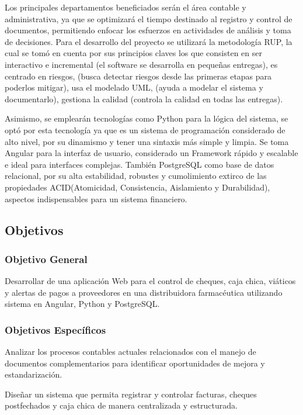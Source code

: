 Los principales departamentos beneficiados serán el área contable y administrativa, ya que se optimizará el tiempo destinado al registro y control de documentos, permitiendo enfocar los esfuerzos en actividades de análisis y toma de decisiones. Para el desarrollo del proyecto se utilizará la metodología RUP, la cual se tomó en cuenta por sus principios claves los que consisten en ser interactivo e incremental (el software se desarrolla en pequeñas entregas), es centrado en riesgos, (busca detectar riesgos desde las primeras etapas para poderlos mitigar), usa el modelado UML, (ayuda a modelar el sistema y documentarlo), gestiona la calidad (controla la calidad en todas las entregas).

Asimismo, se emplearán tecnologías como Python para la lógica del sistema, se optó por esta tecnología ya que es un sistema de programación considerado de alto nivel, por su dinamismo y tener una sintaxis más simple y limpia. Se toma Angular para la interfaz de usuario, considerado un Framework rápido y escalable e ideal para interfaces complejas. También PostgreSQL como base de datos relacional, por su alta estabilidad, robustes y cumolimiento extirco de las propiedades ACID(Atomicidad, Consistencia, Aislamiento y Durabilidad), aspectos indispensables para un sistema financiero.

\subsection{Objetivos}

\subsubsection{Objetivo General}

Desarrollar de una aplicación Web para el control de cheques, caja chica, viáticos y alertas de pagos a proveedores en una distribuidora farmacéutica utilizando sistema en Angular, Python y PostgreSQL.

\subsubsection{Objetivos Específicos}

Analizar los procesos contables actuales relacionados con el manejo de documentos complementarios para identificar oportunidades de mejora y estandarización.

Diseñar un sistema que permita registrar y controlar facturas, cheques postfechados y caja chica de manera centralizada y estructurada.

